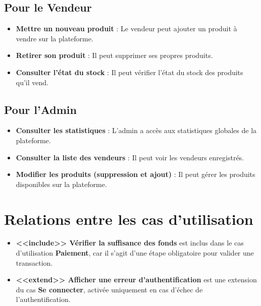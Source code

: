 \documentclass[a4paper,12pt]{article}
\begin{document}
\subsection{Pour le Vendeur}
\begin{itemize}
    \item \textbf{Mettre un nouveau produit} : Le vendeur peut ajouter un produit à vendre sur la plateforme.
    \item \textbf{Retirer son produit} : Il peut supprimer ses propres produits.
    \item \textbf{Consulter l'état du stock} : Il peut vérifier l’état du stock des produits qu’il vend.
\end{itemize}

\subsection{Pour l'Admin}
\begin{itemize}
    \item \textbf{Consulter les statistiques} : L'admin a accès aux statistiques globales de la plateforme.
    \item \textbf{Consulter la liste des vendeurs} : Il peut voir les vendeurs enregistrés.
    \item \textbf{Modifier les produits (suppression et ajout)} : Il peut gérer les produits disponibles sur la plateforme.
\end{itemize}

\section{Relations entre les cas d'utilisation}
\begin{itemize}
    \item \textbf{<<include>> Vérifier la suffisance des fonds} est inclus dans le cas d'utilisation \textbf{Paiement}, car il s'agit d'une étape obligatoire pour valider une transaction.
    \item \textbf{<<extend>> Afficher une erreur d'authentification} est une extension du cas \textbf{Se connecter}, activée uniquement en cas d’échec de l’authentification.
\end{itemize}
\end{document}
